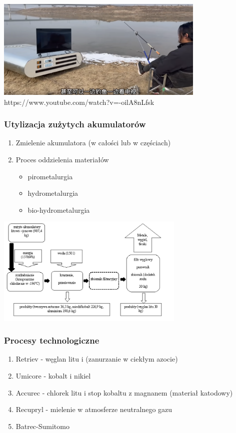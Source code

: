 \documentclass[
	11pt, %
]{beamer}
\begin{document}
	\begin{frame}
	\centering
	\includegraphics[width=10cm]{big-powerbank.png}
	https://www.youtube.com/watch?v=-oilA8nLfsk
	\end{frame}

\begin{frame}
	\frametitle{Utylizacja zużytych akumulatorów}

	\begin{enumerate}
		\item Zmielenie akumulatora (w całości lub w częściach)
		\item Proces oddzielenia materiałów
		\begin{itemize}
			\item pirometalurgia
			\item hydrometalurgia
			\item bio-hydrometalurgia
		\end{itemize}
	\end{enumerate}
\end{frame}

\begin{frame}
	\centering
	\includegraphics[width=9cm]{retriev.png}\cite{k20}
\end{frame}

\begin{frame}
	\frametitle{Procesy technologiczne}

	\begin{enumerate}
		\item Retriev - węglan litu i  (zanurzanie w ciekłym azocie)
		\item Umicore - kobalt i nikiel
		\item Accurec - chlorek litu i stop kobaltu z magnanem (materiał katodowy)
		\item Recupryl - mielenie w atmosferze neutralnego gazu
		\item Batrec-Sumitomo
	\end{enumerate}

\end{frame}
\end{document}
